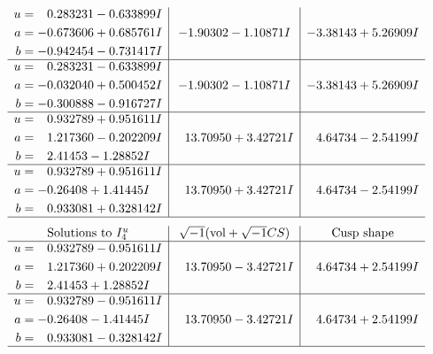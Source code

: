 \documentclass[1p]{elsarticle_modified}
\theoremstyle{definition}
\newcommand{\I}{\sqrt{-1}}
\begin{document}
$$\begin{array}{c|c|c}
\begin{aligned}
u &= \phantom{-}0.283231 - 0.633899 I \\
a &= -0.673606 + 0.685761 I \\
b &= -0.942454 - 0.731417 I\end{aligned}
 & -1.90302 - 1.10871 I & -3.38143 + 5.26909 I \\ \hline\begin{aligned}
u &= \phantom{-}0.283231 - 0.633899 I \\
a &= -0.032040 + 0.500452 I \\
b &= -0.300888 - 0.916727 I\end{aligned}
 & -1.90302 - 1.10871 I & -3.38143 + 5.26909 I \\ \hline\begin{aligned}
u &= \phantom{-}0.932789 + 0.951611 I \\
a &= \phantom{-}1.217360 - 0.202209 I \\
b &= \phantom{-}2.41453 - 1.28852 I\end{aligned}
 & \phantom{-}13.70950 + 3.42721 I & \phantom{-}4.64734 - 2.54199 I \\ \hline\begin{aligned}
u &= \phantom{-}0.932789 + 0.951611 I \\
a &= -0.26408 + 1.41445 I \\
b &= \phantom{-}0.933081 + 0.328142 I\end{aligned}
 & \phantom{-}13.70950 + 3.42721 I & \phantom{-}4.64734 - 2.54199 I\\
 \hline 
 \end{array}$$\newpage$$\begin{array}{c|c|c}  
\text{Solutions to }I^u_{4}& \I (\text{vol} + \sqrt{-1}CS) & \text{Cusp shape}\\
 \hline 
\begin{aligned}
u &= \phantom{-}0.932789 - 0.951611 I \\
a &= \phantom{-}1.217360 + 0.202209 I \\
b &= \phantom{-}2.41453 + 1.28852 I\end{aligned}
 & \phantom{-}13.70950 - 3.42721 I & \phantom{-}4.64734 + 2.54199 I \\ \hline\begin{aligned}
u &= \phantom{-}0.932789 - 0.951611 I \\
a &= -0.26408 - 1.41445 I \\
b &= \phantom{-}0.933081 - 0.328142 I\end{aligned}
 & \phantom{-}13.70950 - 3.42721 I & \phantom{-}4.64734 + 2.54199 I\\
 \hline 
 \end{array}$$\newpage
\end{document}
